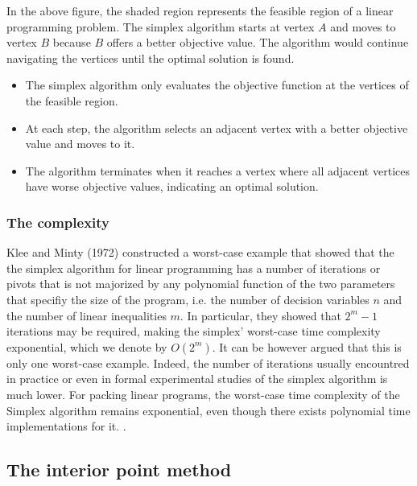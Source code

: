 In the above figure, the shaded region represents
the feasible region of a linear programming problem.
The simplex algorithm starts at vertex \(A\) and moves to
vertex \(B\) because \(B\) offers a better objective value.
The algorithm would continue navigating the vertices until
the optimal solution is found.
\begin{itemize}
    \item The simplex algorithm only evaluates the objective
          function at the vertices of the feasible region.
    \item At each step, the algorithm selects an adjacent
          vertex with a better objective value and moves to it.
    \item The algorithm terminates when it reaches a vertex where
          all adjacent vertices have worse objective values, indicating an
          optimal solution.
\end{itemize}
\subsubsection{The complexity}
Klee and Minty (1972) \parencite{klee1972good} constructed a worst-case example that 
showed that the
the simplex algorithm for linear programming has a number of iterations or pivots that 
is not majorized by any polynomial function of the two parameters that specifiy the size of
the program, i.e. the number of  decision variables $n$ and the number of linear inequalities $m$.
 In particular, they showed that $2^m -1$ iterations may be required, making the simplex'
worst-case time complexity exponential, which we denote by \( O(2^m) \).
It can be however argued that this is only one worst-case example. Indeed, the number 
of iterations usually encountred in practice or even in formal experimental studies of 
the simplex algorithm is much lower.
For packing linear programs, the worst-case time complexity of the Simplex algorithm
remains exponential, even though there exists polynomial time implementations for it.
\parencite{stille2010solution}.

\subsection{The interior point method}

